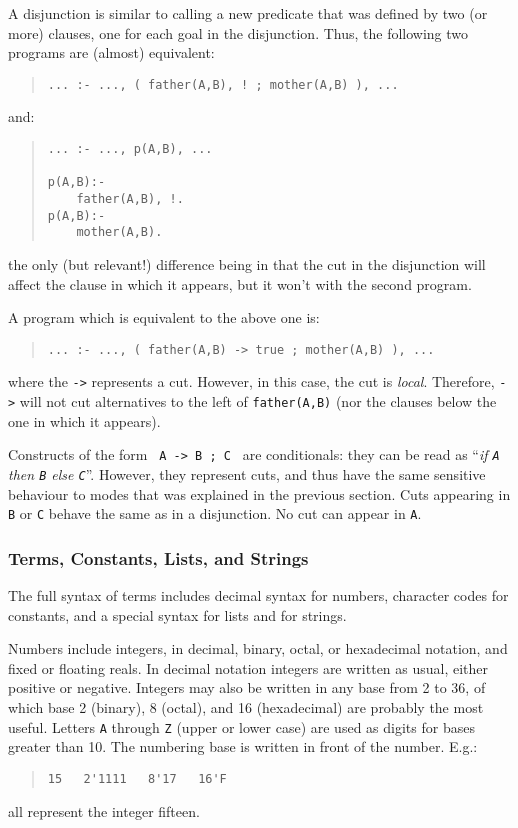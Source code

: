 A disjunction is similar to calling a new predicate that was defined by
two (or more) clauses, one for each goal in the disjunction. Thus, the
following two programs are (almost) equivalent:
\begin{quote}
\begin{verbatim}
... :- ..., ( father(A,B), ! ; mother(A,B) ), ...
\end{verbatim}
\end{quote}
%
and:
\begin{quote}
\begin{verbatim}
... :- ..., p(A,B), ...

p(A,B):-
    father(A,B), !.
p(A,B):-
    mother(A,B).
\end{verbatim}
\end{quote}
%
the only (but relevant!) difference being in that the cut in the
disjunction will affect the clause in which it appears, but it won't
with the second program.

A program which is equivalent to the above one is:
\begin{quote}
\begin{verbatim}
... :- ..., ( father(A,B) -> true ; mother(A,B) ), ...
\end{verbatim}
\end{quote}
%
where the \verb+->+ represents a cut. However, in this case, the cut
is {\em local}. Therefore, \verb+->+ will not cut alternatives to the
left of \verb+father(A,B)+ (nor the clauses below the one in which it
appears).

Constructs of the form \verb+ A -> B ; C + are conditionals: they can be
read as ``{\em if \verb+A+ then \verb+B+ else \verb+C+}''. However,
they represent cuts, and thus have the same sensitive behaviour to
modes that was explained in the previous section. Cuts appearing in
\verb+B+ or \verb+C+ behave the same as in a disjunction. No cut can
appear in \verb+A+.


\subsubsection{Terms, Constants, Lists, and Strings}

The full syntax of terms includes decimal syntax for numbers,
character codes for constants, and a special syntax for lists and for
strings. 

Numbers include integers, in decimal, binary, octal, or hexadecimal
notation, and fixed or floating reals. In decimal notation integers
are written as usual, either positive or negative. Integers may also be
written in any base from 2 to 36, of which base 2 (binary), 8 (octal),
and 16 (hexadecimal) are probably the most useful.  Letters \verb+A+
through \verb+Z+ (upper or lower case) are used as digits for bases
greater than 10. The numbering base is written in front of the
number. E.g.: 
\begin{quote}
\begin{verbatim}
15   2'1111   8'17   16'F
\end{verbatim}
\end{quote}
%
all represent the integer fifteen.

